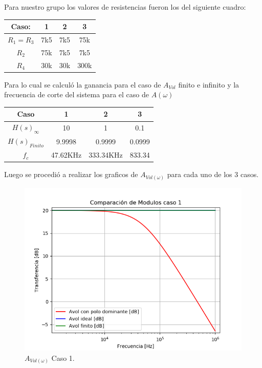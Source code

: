 Para nuestro grupo los valores de resistencias fueron los del siguiente cuadro:
\begin{table}[H]
\begin{center}
\begin{tabular}{|c|c|c|c|}
\hline
\textbf{Caso:}              & \textbf{1}               & \textbf{2}               & \textbf{3}                \\ \hline
$R_1=R_3$                   & 7k5                      & 7k5                      & 75k                       \\ \hline
$R_2$                       & 75k                      & 7k5                      & 7k5                       \\ \hline
\multicolumn{1}{|c|}{$R_4$} & \multicolumn{1}{l|}{30k} & \multicolumn{1}{l|}{30k} & \multicolumn{1}{l|}{300k} \\ \hline
\end{tabular}
\end{center}
\end{table}
Para lo cual se calculó la ganancia para el caso de $A_{Vol}$ finito e infinito y la frecuencia de corte del sistema para el caso de $A(\omega)$
\begin{table}[H]
\begin{center}
\begin{tabular}{|c|c|c|c|}
\hline
\textbf{Caso}            & \textbf{1} & \textbf{2} & \textbf{3} \\ \hline
\textbf{$H(s)_{\infty}$} & 10         & 1          & 0.1        \\ \hline
\textbf{$H(s)_{Finito}$} & 9.9998     & 0.9999     & 0.0999     \\ \hline
\textbf{$f_c$}           & 47.62KHz   & 333.34KHz  & 833.34     \\ \hline
\end{tabular}
\end{center}
\end{table}
Luego se procedió a realizar los graficos de $A_{Vol(\omega)}$ para cada uno de los 3 casos.
\begin{figure}[H]	
	\centering
	\includegraphics[width=\textwidth]{Ejercicio1/Imagenes/HCompC1.png}
	\caption{$A_{Vol(\omega)}$ Caso 1.}
	\label{fig:AvolC1}
\end{figure}
